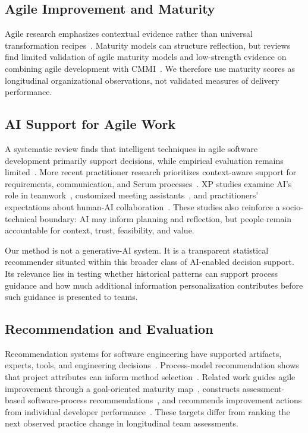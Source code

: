 \documentclass[runningheads]{llncs}
\begin{document}
\subsection{Agile Improvement and Maturity}

Agile research emphasizes contextual evidence rather than universal transformation recipes~\cite{dyba2008empirical,dikert2016large}. Maturity models can structure reflection, but reviews find limited validation of agile maturity models and low-strength evidence on combining agile development with CMMI~\cite{henriques2017maturity,silva2015cmmi}. We therefore use maturity scores as longitudinal organizational observations, not validated measures of delivery performance.

\subsection{AI Support for Agile Work}

A systematic review finds that intelligent techniques in agile software development primarily support decisions, while empirical evaluation remains limited~\cite{perkusich2020intelligent}. More recent practitioner research prioritizes context-aware support for requirements, communication, and Scrum processes~\cite{fujs2026scrumai}. XP studies examine AI's role in teamwork~\cite{kwok2026aiteamwork}, customized meeting assistants~\cite{cabrero2024assistants}, and practitioners' expectations about human-AI collaboration~\cite{planotscher2026collaboration}. These studies also reinforce a socio-technical boundary: AI may inform planning and reflection, but people remain accountable for context, trust, feasibility, and value.

Our method is not a generative-AI system. It is a transparent statistical recommender situated within this broader class of AI-enabled decision support. Its relevance lies in testing whether historical patterns can support process guidance and how much additional information personalization contributes before such guidance is presented to teams.

\subsection{Recommendation and Evaluation}

Recommendation systems for software engineering have supported artifacts, experts, tools, and engineering decisions~\cite{gasparic2016recommend}. Process-model recommendation shows that project attributes can inform method selection~\cite{song2016process}. Related work guides agile improvement through a goal-oriented maturity map~\cite{packlick2007maturity}, constructs assessment-based software-process recommendations~\cite{choi2012remo}, and recommends improvement actions from individual developer performance~\cite{raza2017webprocesspair}. These targets differ from ranking the next observed practice change in longitudinal team assessments.
\end{document}
